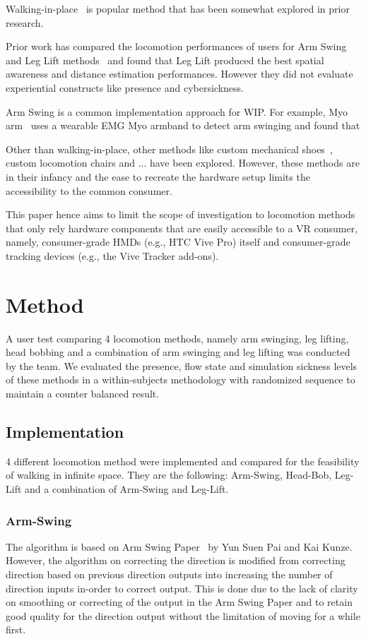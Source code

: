 \documentclass[manuscript,review,anonymous]{acmart}
\begin{document}
Walking-in-place~\cite{virtualLoco1999} is popular method that has been somewhat explored in prior research.

Prior work has compared the locomotion performances of users for Arm Swing and Leg Lift methods~\cite{vrLocoWalkingHeadBob2016} and found that Leg Lift produced the best spatial awareness and distance estimation performances. However they did not evaluate experiential constructs like presence and cybersickness.

Arm Swing is a common implementation approach for WIP. For example, Myo arm~\cite{mccullough2015myo} uses a wearable EMG Myo armband to detect arm swinging and found that

Other than walking-in-place, other methods like custom mechanical shoes~\cite{podoportation2020}, custom locomotion chairs and ... have been explored. However, these methods are in their infancy and the ease to recreate the hardware setup limits the accessibility to the common consumer.

This paper hence aims to limit the scope of investigation to locomotion methods that only rely hardware components that are easily accessible to a VR consumer, namely, consumer-grade HMDs (e.g., HTC Vive Pro) itself and consumer-grade tracking devices (e.g., the Vive Tracker add-ons).


\section{Method}

A user test comparing 4 locomotion methods, namely arm swinging, leg lifting, head bobbing and a combination of arm swinging and leg lifting was conducted by the team. We evaluated the presence, flow state and simulation sickness levels of these methods in a within-subjects methodology with randomized sequence to maintain a counter balanced result.

\subsection{Implementation}
4 different locomotion method were implemented and compared for the feasibility of walking in infinite space. They are the following:
Arm-Swing, Head-Bob, Leg-Lift and a combination of Arm-Swing and Leg-Lift.

\subsubsection{Arm-Swing}
The algorithm is based on Arm Swing Paper~\cite{armSwing2017} by Yun Suen Pai and Kai Kunze. However, the algorithm on correcting the direction is modified from correcting direction based on previous direction outputs into increasing the number of direction inputs in-order to correct output. This is done due to the lack of clarity on smoothing or correcting of the output in the Arm Swing Paper and to retain good quality for the direction output without the limitation of moving for a while first.
\end{document}
